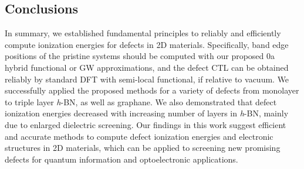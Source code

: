 
\subsection{Conclusions}

In summary, we established fundamental principles to reliably and efficiently compute ionization energies for defects in 2D materials.
Specifically, band edge positions of the pristine systems should be computed with our proposed \p0a hybrid functional or GW approximations, and the defect CTL can be obtained reliably by standard DFT with semi-local functional, if relative to vacuum.
We successfully applied the proposed methods for a variety of defects from monolayer to triple layer \textit{h}-BN, as well as  graphane.  We also demonstrated that defect ionization energies decreased with increasing number of layers in \textit{h}-BN, mainly due to enlarged dielectric screening. Our findings in this work suggest efficient and accurate methods to compute defect ionization energies and electronic structures in 2D materials, which can be applied to screening new promising defects for quantum information and optoelectronic applications.

